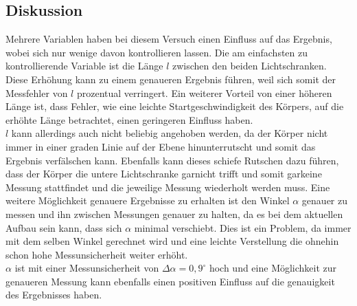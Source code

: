 \subsection{Diskussion} \label{chap:Diskussion}
Mehrere Variablen haben bei diesem Versuch einen Einfluss auf das Ergebnis, wobei sich nur wenige davon kontrollieren lassen. Die am einfachsten zu kontrollierende Variable ist die Länge $l$ zwischen den beiden Lichtschranken.
\\
Diese Erhöhung kann zu einem genaueren Ergebnis führen, weil sich somit der Messfehler von $l$ prozentual verringert. Ein weiterer Vorteil von einer höheren Länge ist, dass Fehler, wie eine leichte Startgeschwindigkeit des Körpers, auf die erhöhte Länge betrachtet, einen geringeren Einfluss haben. \\ $l$ kann allerdings auch nicht beliebig angehoben werden, da der Körper nicht immer in einer graden Linie auf der Ebene hinunterrutscht und somit das Ergebnis verfälschen kann. Ebenfalls kann dieses schiefe Rutschen dazu führen, dass der Körper die untere Lichtschranke garnicht trifft und somit garkeine Messung stattfindet und die jeweilige Messung wiederholt werden muss.\bigbreak 
Eine weitere Möglichkeit genauere Ergebnisse zu erhalten ist den Winkel $\alpha$ genauer zu messen und ihn zwischen Messungen genauer zu halten, da es bei dem aktuellen Aufbau sein kann, dass sich $\alpha$ minimal verschiebt. Dies ist ein Problem, da immer mit dem selben Winkel gerechnet wird und eine leichte Verstellung die ohnehin schon hohe Messunsicherheit weiter erhöht. \\ 
$\alpha$ ist mit einer Messunsicherheit von $\Delta \alpha = 0,9^\circ$ hoch und eine Möglichkeit zur genaueren Messung kann ebenfalls einen positiven Einfluss auf die genauigkeit des Ergebnisses haben.